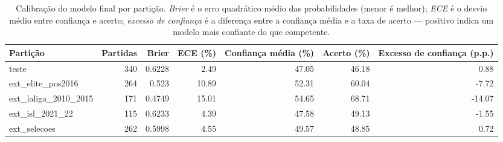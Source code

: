 \begin{table}[htbp]
\centering
\caption{Calibração do modelo final por partição. \emph{Brier} é o erro quadrático médio das probabilidades (menor é melhor); \emph{ECE} é o desvio médio entre confiança e acerto; \emph{excesso de confiança} é a diferença entre a confiança média e a taxa de acerto — positivo indica um modelo mais confiante do que competente.}
\label{tab:wp6-calibracao}
\small
\begin{tabular}{lrrrrrr}
\toprule
Partição & Partidas & Brier & ECE (\%) & Confiança média (\%) & Acerto (\%) & Excesso de confiança (p.p.) \\
\midrule
teste & 340 & 0.6228 & 2.49 & 47.05 & 46.18 & 0.88 \\
ext\_elite\_pos2016 & 264 & 0.523 & 10.89 & 52.31 & 60.04 & -7.72 \\
ext\_laliga\_2010\_2015 & 171 & 0.4749 & 15.01 & 54.65 & 68.71 & -14.07 \\
ext\_isl\_2021\_22 & 115 & 0.6233 & 4.39 & 47.58 & 49.13 & -1.55 \\
ext\_selecoes & 262 & 0.5998 & 4.55 & 49.57 & 48.85 & 0.72 \\
\bottomrule
\end{tabular}
\end{table}
